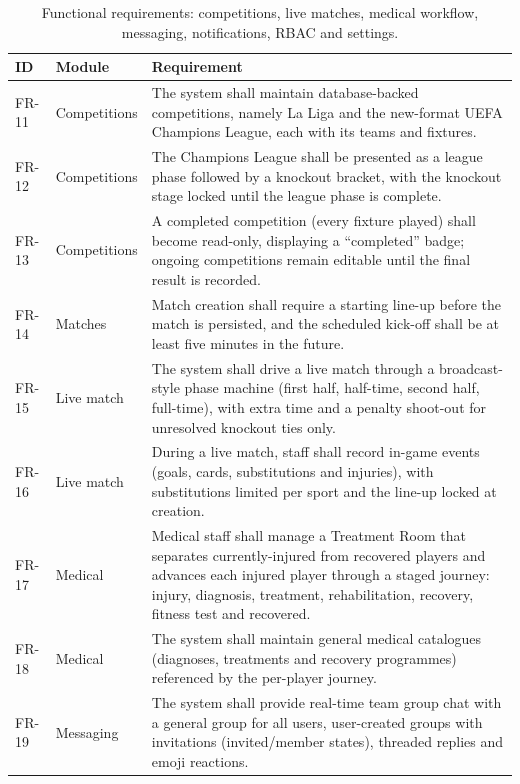 \begin{table}[htbp]
\centering
\caption{Functional requirements: competitions, live matches, medical workflow, messaging, notifications, RBAC and settings.}
\label{tab:fr-new}
\renewcommand{\arraystretch}{1.25}
\begin{tabular}{|p{}|p{}|p{}|}
\hline
\textbf{ID} & \textbf{Module} & \textbf{Requirement} \\
\hline
FR-11 & Competitions & The system shall maintain database-backed competitions, namely La Liga and the new-format UEFA Champions League, each with its teams and fixtures. \\
\hline
FR-12 & Competitions & The Champions League shall be presented as a league phase followed by a knockout bracket, with the knockout stage locked until the league phase is complete. \\
\hline
FR-13 & Competitions & A completed competition (every fixture played) shall become read-only, displaying a ``completed'' badge; ongoing competitions remain editable until the final result is recorded. \\
\hline
FR-14 & Matches & Match creation shall require a starting line-up before the match is persisted, and the scheduled kick-off shall be at least five minutes in the future. \\
\hline
FR-15 & Live match & The system shall drive a live match through a broadcast-style phase machine (first half, half-time, second half, full-time), with extra time and a penalty shoot-out for unresolved knockout ties only. \\
\hline
FR-16 & Live match & During a live match, staff shall record in-game events (goals, cards, substitutions and injuries), with substitutions limited per sport and the line-up locked at creation. \\
\hline
FR-17 & Medical & Medical staff shall manage a Treatment Room that separates currently-injured from recovered players and advances each injured player through a staged journey: injury, diagnosis, treatment, rehabilitation, recovery, fitness test and recovered. \\
\hline
FR-18 & Medical & The system shall maintain general medical catalogues (diagnoses, treatments and recovery programmes) referenced by the per-player journey. \\
\hline
FR-19 & Messaging & The system shall provide real-time team group chat with a general group for all users, user-created groups with invitations (invited/member states), threaded replies and emoji reactions. \\

\end{tabular}
\end{table}
